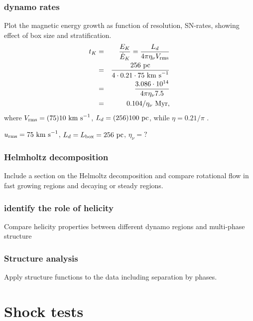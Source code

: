 \documentclass[preprint2]{aastex63}
\newcommand\pc{~ {\rm pc}}
\newcommand\Myr{~ {\rm Myr}}
\newcommand\kms{~ {\rm km~ s}^{-1}}
\begin{document}
\subsubsection{dynamo rates}
Plot the magnetic energy growth as function of resolution, SN-rates, showing
effect of box size and stratification.
\begin{eqnarray}
t_K &=& \frac{E_K} {\dot{E}_K} = \frac{L_d}{4\pi \eta_\nu V_{\rm rms}}\\
                      &=&\frac{ 256 \pc }{4 \cdot 0.21 \cdot 75 \kms} \\
                      &=& \frac{3.086\cdot10^{14}}{4\pi \eta_\nu 7.5}\\
                      &=&  0.104/\eta_\nu \Myr,
\end{eqnarray}
where $V_{\rm rms} = (75) 10 \kms$, $L_d = (256) 100 \pc$, while $\eta = 0.21 / \pi$ 
\citep{MacLow99}.

$u_{\rm rms}=75\kms$, $L_d = L_{\rm box} = 256\pc$, $\eta_\nu = ?$

\subsubsection{Helmholtz decomposition}
Include a section on the Helmoltz decomposition and compare rotational flow
in fast growing regions and decaying or steady regions. 

\subsubsection{identify the role of helicity}
Compare helicity properties between different dynamo regions and multi-phase
structure

\subsubsection{Structure analysis}
Apply structure functions to the data including separation by phases.

\section[]{Shock tests}
\label{sect:shocks}
\end{document}
